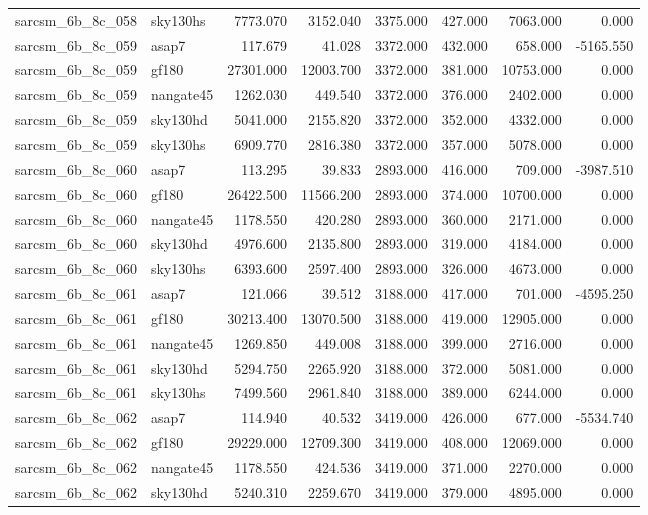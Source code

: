 \begin{tabular}{llrrrrrr}
sarcsm\_6b\_8c\_058 & sky130hs & 7773.070 & 3152.040 & 3375.000 & 427.000 & 7063.000 & 0.000 \\
sarcsm\_6b\_8c\_059 & asap7 & 117.679 & 41.028 & 3372.000 & 432.000 & 658.000 & -5165.550 \\
sarcsm\_6b\_8c\_059 & gf180 & 27301.000 & 12003.700 & 3372.000 & 381.000 & 10753.000 & 0.000 \\
sarcsm\_6b\_8c\_059 & nangate45 & 1262.030 & 449.540 & 3372.000 & 376.000 & 2402.000 & 0.000 \\
sarcsm\_6b\_8c\_059 & sky130hd & 5041.000 & 2155.820 & 3372.000 & 352.000 & 4332.000 & 0.000 \\
sarcsm\_6b\_8c\_059 & sky130hs & 6909.770 & 2816.380 & 3372.000 & 357.000 & 5078.000 & 0.000 \\
sarcsm\_6b\_8c\_060 & asap7 & 113.295 & 39.833 & 2893.000 & 416.000 & 709.000 & -3987.510 \\
sarcsm\_6b\_8c\_060 & gf180 & 26422.500 & 11566.200 & 2893.000 & 374.000 & 10700.000 & 0.000 \\
sarcsm\_6b\_8c\_060 & nangate45 & 1178.550 & 420.280 & 2893.000 & 360.000 & 2171.000 & 0.000 \\
sarcsm\_6b\_8c\_060 & sky130hd & 4976.600 & 2135.800 & 2893.000 & 319.000 & 4184.000 & 0.000 \\
sarcsm\_6b\_8c\_060 & sky130hs & 6393.600 & 2597.400 & 2893.000 & 326.000 & 4673.000 & 0.000 \\
sarcsm\_6b\_8c\_061 & asap7 & 121.066 & 39.512 & 3188.000 & 417.000 & 701.000 & -4595.250 \\
sarcsm\_6b\_8c\_061 & gf180 & 30213.400 & 13070.500 & 3188.000 & 419.000 & 12905.000 & 0.000 \\
sarcsm\_6b\_8c\_061 & nangate45 & 1269.850 & 449.008 & 3188.000 & 399.000 & 2716.000 & 0.000 \\
sarcsm\_6b\_8c\_061 & sky130hd & 5294.750 & 2265.920 & 3188.000 & 372.000 & 5081.000 & 0.000 \\
sarcsm\_6b\_8c\_061 & sky130hs & 7499.560 & 2961.840 & 3188.000 & 389.000 & 6244.000 & 0.000 \\
sarcsm\_6b\_8c\_062 & asap7 & 114.940 & 40.532 & 3419.000 & 426.000 & 677.000 & -5534.740 \\
sarcsm\_6b\_8c\_062 & gf180 & 29229.000 & 12709.300 & 3419.000 & 408.000 & 12069.000 & 0.000 \\
sarcsm\_6b\_8c\_062 & nangate45 & 1178.550 & 424.536 & 3419.000 & 371.000 & 2270.000 & 0.000 \\
sarcsm\_6b\_8c\_062 & sky130hd & 5240.310 & 2259.670 & 3419.000 & 379.000 & 4895.000 & 0.000 \\

\end{tabular}
